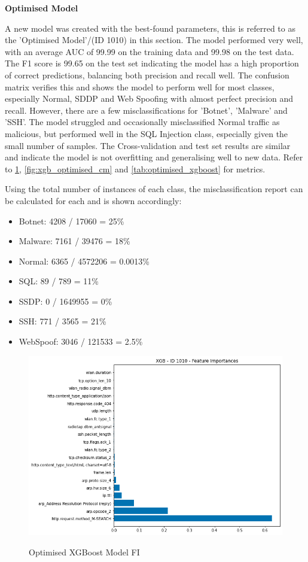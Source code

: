 \textbf{Optimised Model}
\medskip

A new model was created with the best-found parameters, this is referred to as the 'Optimised Model'/(ID 1010) in this section. The model performed very well, with an average AUC of 99.99 on the training data and 99.98 on the test data. The F1 score is 99.65 on the test set indicating the model has a high proportion of correct predictions, balancing both precision and recall well. The confusion matrix verifies this and shows the model to perform well for most classes, especially Normal, SDDP and Web Spoofing with almost perfect precision and recall. However, there are a few misclassifications for 'Botnet', 'Malware' and 'SSH'. The model struggled and occasionally misclassified Normal traffic as malicious, but performed well in the SQL Injection class, especially given the small number of samples. The Cross-validation and test set results are similar and indicate the model is not overfitting and generalising well to new data. Refer to \ref{fig:xgb_optimised_fi}, \ref{fig:xgb_optimised_cm} and \ref{tab:optimised_xgboost} for metrics.

Using the total number of instances of each class, the misclassification report can be calculated for each and is shown accordingly:

\begin{itemize}
	\item Botnet: 4208 / 17060 = {\color{red} 25\%}
	\item Malware: 7161 / 39476 = 18\%
	\item Normal: 6365 / 4572206 = 0.0013\%
	\item SQL: 89 / 789 = 11\%
	\item SSDP: 0 / 1649955 = {\color{mygreen} 0\%}
	\item SSH: 771 / 3565 = 21\%
	\item WebSpoof: 3046 / 121533 = 2.5\%
\end{itemize}


\begin{figure}[H]
\centering
\caption{Optimised XGBoost Model FI}
\includegraphics[width=\textwidth]{Appendices/Images/XGB/xgb_1010_fi.png}
\label{fig:xgb_optimised_fi}
\end{figure}

